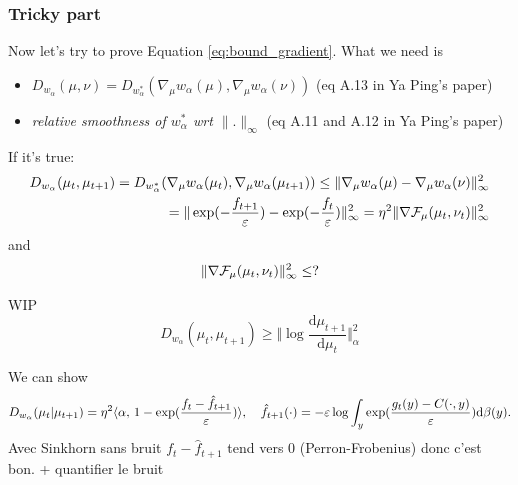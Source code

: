 \documentclass[a4paper, 10pt]{article}
\begin{document}
\subsubsection{Tricky part}
Now let's try to prove Equation \ref{eq:bound_gradient}. 
What we need is 
\begin{itemize}
	\item $D_{w_{\alpha}}(\mu,\nu)=D_{w_{\alpha}^*}(\nabla_{\mu}w_{\alpha}(\mu), \nabla_{\mu}w_{\alpha}(\nu))$ (eq A.13 in Ya Ping's paper)
	\item  \textit{relative smoothness of $w_{\alpha}^*$ wrt $\|.\|_{\infty}$} (eq A.11 and A.12 in Ya Ping's paper)
\end{itemize}
 If it's true:
\begin{align*}
D_{w_{\alpha}}(\mu_t,\mu_{t+1}) = D_{w_{\alpha}^*}(\nabla_{\mu}w_{\alpha}(\mu_t), \nabla_{\mu}w_{\alpha}(\mu_{t+1}))\le \| \nabla_{\mu}w_{\alpha}(\mu)- \nabla_{\mu}w_{\alpha}(\nu)\|^2_{\infty}\\
=\| \exp(-\frac{f_{t+1}}{\varepsilon})- \exp(-\frac{f_t}{\varepsilon})\|^2_{\infty} = \eta^2 \| \nabla \mathcal{F}_{\mu}(\mu_t,\nu_t)\|^2_{\infty}
\end{align*}
and 
\begin{align*}
\|\nabla \mathcal{F}_{\mu}(\mu_t,\nu_t)\|^2_{\infty}\le ?
\end{align*}

WIP
\begin{equation}
    D_{w_{\alpha}}(\mu_t,\mu_{t+1}) \geq
    \Vert \log \frac{\mathrm d \mu_{t+1}}{\mathrm d \mu_{t}} \Vert_\alpha^2
\end{equation}

We can show
\begin{equation}
    D_{w_\alpha}(\mu_t | \mu_{t+1}) = \eta^2
    \langle \alpha,\,1 - \exp(\frac{f_t - \hat f_{t+1}}{\varepsilon})\rangle,
    \quad \hat f_{t+1}(\cdot) 
    = - \varepsilon \log \int_y \exp(\frac{g_t(y) - C(\cdot, y)}{\varepsilon}) \mathrm d \beta(y).
\end{equation}
Avec Sinkhorn sans bruit $f_t - \hat f_{t+1}$ tend vers 0 (Perron-Frobenius) donc c'est bon. + quantifier le bruit

\printbibliography
\end{document}
